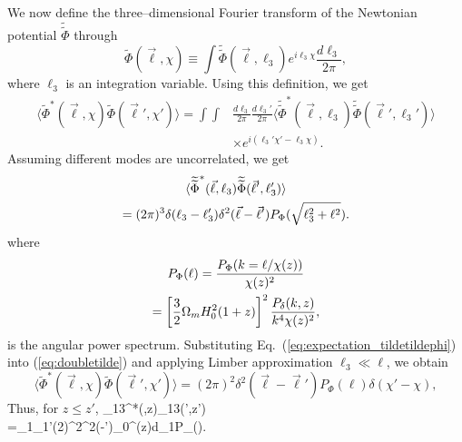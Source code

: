 We now define the three--dimensional Fourier transform of the Newtonian potential $\widetilde{\widetilde\Phi}$ through
\begin{equation}
\widetilde{\Phi}(\vec{\ell},\chi)\equiv\int\widetilde{\widetilde{\Phi}}(\vec{\ell},\ell_3)e^{i\ell_3\chi}\frac{d\ell_3}{2\pi},
\end{equation}
where $\ell_3$ is an integration variable. Using this definition, we get
\begin{align}
\langle\widetilde{\Phi}^*(\vec{\ell},\chi)\widetilde{\Phi}(\vec{\ell}',\chi')\rangle=\int\int&\frac{d\ell_3}{2\pi}\frac{d\ell_3'}{2\pi}\langle\widetilde{\widetilde{\Phi}}^*(\vec{\ell},\ell_3)\widetilde{\widetilde{\Phi}}(\vec{\ell}',\ell_3')\rangle\nonumber\\
&\times e^{i(\ell_3'\chi'-\ell_3\chi)}. \label{eq:doubletilde}
\end{align}
Assuming different modes are uncorrelated, we get
\begin{equation}
\begin{gathered}
\langle\widetilde{\widetilde{\Phi}}^*(\vec{\ell},\ell_3)\widetilde{\widetilde{\Phi}}(\vec{\ell}',\ell_3')\rangle\\
=(2\pi)^3\delta(\ell_3-\ell_3')\delta^2(\vec{\ell}-\vec{\ell}')P_{\Phi}(\sqrt{\ell_3^2+\ell^2}).
\end{gathered}
\label{eq:expectation_tildetildephi}
\end{equation}
where
\begin{equation}
\begin{gathered}
P_{\Phi}(\ell)=\frac{P_{\Phi}(k=\ell/\chi(z))}{\chi(z)^2}\\
=\left[\frac{3}{2}\Omega_mH_0^2(1+z)\right]^2\frac{P_{\delta}(k,z)}{k^4\chi(z)^2},
\end{gathered}
\end{equation}
is the angular power spectrum.
Substituting Eq.~(\ref{eq:expectation_tildetildephi}) into (\ref{eq:doubletilde}) and applying Limber approximation $\ell_3\ll\ell$, we obtain
\begin{equation}
\langle\widetilde{\Phi}^*(\vec{\ell},\chi)\widetilde{\Phi}(\vec{\ell}',\chi')\rangle=(2\pi)^2\delta^2(\vec{\ell}-\vec{\ell}')P_{\Phi}(\ell)\delta(\chi'-\chi),
\end{equation}
Thus, for $z\leq z'$,
\beq
\bga
\langle\widetilde{\gamma}_{13}^*(\vec{\ell},z)\widetilde{\gamma}_{13}(\vec{\ell}',z')\rangle\\
=\ell_1\ell_1'(2\pi)^2\delta^2(\vec{\ell}-\vec{\ell}')\int_0^{\chi(z)}d\chi_1P_{\Phi}(\ell).
\ega
\label{eq:exp_gamma13}
\eeq

